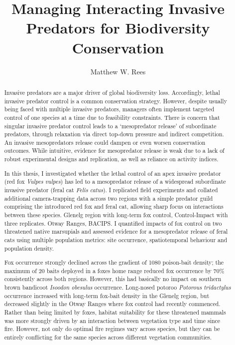 \documentclass[11pt,a4paper,titlepage,twoside,openright]{style/unimelbthesis}
\title{Managing Interacting Invasive Predators for Biodiversity Conservation}
\author{Matthew W. Rees}
\begin{document}
\begin{frontmatter}


  \maketitle

  \begin{abstract}
    Invasive predators are a major driver of global biodiversity loss. Accordingly, lethal invasive predator control is a common conservation strategy. However, despite usually being faced with multiple invasive predators, managers often implement targeted control of one species at a time due to feasibility constraints. There is concern that singular invasive predator control leads to a `mesopredator release' of subordinate predators, through relaxation via direct top-down pressure and indirect competition. An invasive mesopredators release could dampen or even worsen conservation outcomes. While intuitive, evidence for mesopredator release is weak due to a lack of robust experimental designs and replication, as well as reliance on activity indices.
    
    In this thesis, I investigated whether the lethal control of an apex invasive predator (red fox \emph{Vulpes vulpes}) has led to a mesopredator release of a widespread subordinate invasive predator (feral cat \emph{Felis catus}). I replicated field experiments and collated additional camera-trapping data across two regions with a simple predator guild comprising the introduced red fox and feral cat, allowing sharp focus on interactions between these species. Glenelg region with long-term fox control, Control-Impact with three replicates. Otway Ranges, BACIPS. I quantified impacts of fox control on two threatened native marsupials and assessed evidence for a mesopredator release of feral cats using multiple population metrics: site occurrence, spatiotemporal behaviour and population density.
    
    Fox occurrence strongly declined across the gradient of 1080 poison-bait density; the maximum of 20 baits deployed in a foxes home range reduced fox occurrence by 70\% consistently across both regions. However, this had basically no impact on southern brown bandicoot \emph{Isoodon obesulus} occurrence. Long-nosed potoroo \emph{Potorous tridactylus} occurrence increased with long-term fox-bait density in the Glenelg region, but decreased slightly in the Otway Ranges where fox control had recently commenced. Rather than being limited by foxes, habitat suitability for these threatened mammals was more strongly driven by an interaction between vegetation type and time since fire. However, not only do optimal fire regimes vary across species, but they can be entirely conflicting for the same species across different vegetation communities.
    

\end{abstract}
\end{frontmatter}
\end{document}
